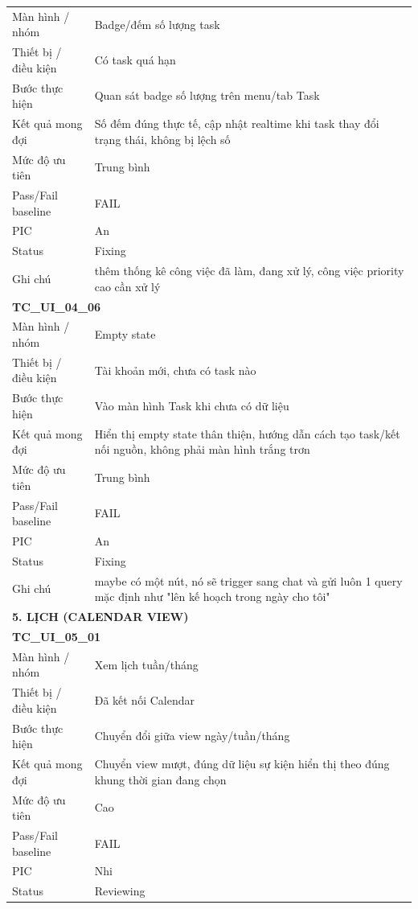 \documentclass[12pt,a4paper]{article}
\begin{document}
\begin{longtable}{p{3.0cm}p{11.5cm}}
Màn hình / nhóm & Badge/đếm số lượng task \\
Thiết bị / điều kiện & Có task quá hạn \\
Bước thực hiện & Quan sát badge số lượng trên menu/tab Task \\
Kết quả mong đợi & Số đếm đúng thực tế, cập nhật realtime khi task thay đổi trạng thái, không bị lệch số \\
Mức độ ưu tiên & Trung bình \\
Pass/Fail baseline & FAIL \\
PIC & An \\
Status & Fixing \\
Ghi chú & thêm thống kê công việc đã làm, đang xử lý, công việc priority cao cần xử lý \\
\midrule
\multicolumn{2}{l}{\textbf{TC\_UI\_04\_06}} \\
Màn hình / nhóm & Empty state \\
Thiết bị / điều kiện & Tài khoản mới, chưa có task nào \\
Bước thực hiện & Vào màn hình Task khi chưa có dữ liệu \\
Kết quả mong đợi & Hiển thị empty state thân thiện, hướng dẫn cách tạo task/kết nối nguồn, không phải màn hình trắng trơn \\
Mức độ ưu tiên & Trung bình \\
Pass/Fail baseline & FAIL \\
PIC & An \\
Status & Fixing \\
Ghi chú & maybe có một nút, nó sẽ trigger sang chat và gửi luôn 1 query mặc định như "lên kế hoạch trong ngày cho tôi" \\
\midrule
\multicolumn{2}{l}{\textbf{5. LỊCH (CALENDAR VIEW)}} \\ \midrule
\multicolumn{2}{l}{\textbf{TC\_UI\_05\_01}} \\
Màn hình / nhóm & Xem lịch tuần/tháng \\
Thiết bị / điều kiện & Đã kết nối Calendar \\
Bước thực hiện & Chuyển đổi giữa view ngày/tuần/tháng \\
Kết quả mong đợi & Chuyển view mượt, đúng dữ liệu sự kiện hiển thị theo đúng khung thời gian đang chọn \\
Mức độ ưu tiên & Cao \\
Pass/Fail baseline & FAIL \\
PIC & Nhi \\
Status & Reviewing \\

\end{longtable}
\end{document}
